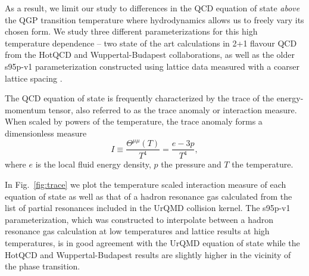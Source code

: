 \documentclass[aps,prc,reprint,amsmath,nofootinbib,superscriptaddress]{revtex4-1}
\begin{document}
As a result, we limit our study to differences in the QCD equation of state \emph{above} the QGP transition temperature where hydrodynamics allows us to 
freely vary its chosen form. We study three different parameterizations for this high temperature dependence -- two state of the art calculations 
in 2+1 flavour QCD from the HotQCD \cite{Bazavov:2014pvz} and Wuppertal-Budapest \cite{Borsanyi:2013bia} collaborations, as well as the older s95p-v1 
parameterization \cite{Huovinen:2009yb} constructed using lattice data measured with a coarser lattice spacing \cite{Bazavov:2009zn}.

The QCD equation of state is frequently characterized by the trace of the energy-momentum tensor, also referred to as the trace anomaly or interaction measure. 
When scaled by powers of the temperature, the trace anomaly forms a dimensionless measure
\begin{equation}
 I \equiv \frac{\Theta^{\mu\mu}(T)}{T^4} = \frac{e - 3p}{T^4},
\end{equation}
where $e$ is the local fluid energy density, $p$ the pressure and $T$ the temperature.

In Fig.~\ref{fig:trace} we plot the temperature scaled interaction measure of each equation of state as well as that of a hadron resonance gas calculated from 
the list of partial resonances included in the UrQMD collision kernel. The s95p-v1 parameterization, which was constructed to interpolate between 
a hadron resonance gas calculation at low temperatures and lattice results at high temperatures, is in good agreement with the UrQMD equation of state while the 
HotQCD and Wuppertal-Budapest results are slightly higher in the vicinity of the phase transition.
\end{document}
